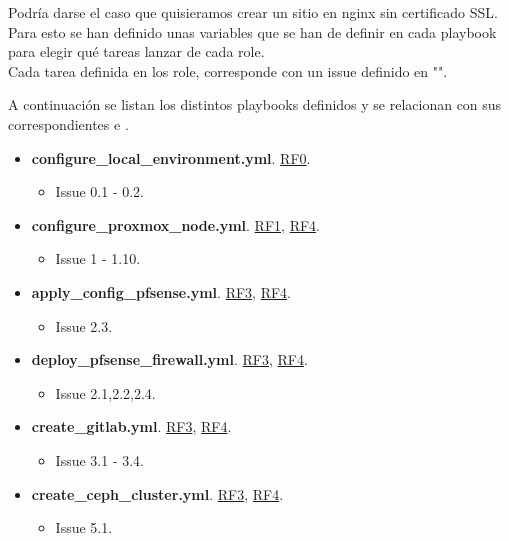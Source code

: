 \begin{text}
\begin{text}
	Podría darse el caso que quisieramos crear un sitio en nginx sin certificado SSL. Para esto se han definido unas variables que se han de definir en cada playbook para elegir qué tareas lanzar de cada role. \\
	Cada tarea definida en los role, corresponde con un issue definido en "".
	
	\clearpage
	
	A continuación se listan los distintos playbooks definidos y se relacionan con sus correspondientes  e .
	
	\begin{itemize}
		\item \textbf{configure\_local\_environment.yml}. \hyperref[RF0]{RF0}.
		\begin{itemize}
			\item Issue 0.1 - 0.2.
		\end{itemize}
	
		\item \textbf{configure\_proxmox\_node.yml}. \hyperref[RF1]{RF1}, \hyperref[RF4]{RF4}.
		\begin{itemize}
			\item Issue 1 - 1.10.
		\end{itemize}
	
		\item \textbf{apply\_config\_pfsense.yml}. \hyperref[RF3]{RF3}, \hyperref[RF4]{RF4}.
		\begin{itemize}
			\item Issue 2.3.
		\end{itemize}
	
		\item \textbf{deploy\_pfsense\_firewall.yml}. \hyperref[RF3]{RF3}, \hyperref[RF4]{RF4}.
		\begin{itemize}
			\item Issue 2.1,2.2,2.4.
		\end{itemize}
		
		\item \textbf{create\_gitlab.yml}. \hyperref[RF3]{RF3}, \hyperref[RF4]{RF4}.
		\begin{itemize}
			\item Issue 3.1 - 3.4.
		\end{itemize}
	
		\item \textbf{create\_ceph\_cluster.yml}. \hyperref[RF3]{RF3}, \hyperref[RF4]{RF4}.
		\begin{itemize}
			\item Issue 5.1.
		\end{itemize}
	

\end{itemize}
\end{text}
\end{text}
